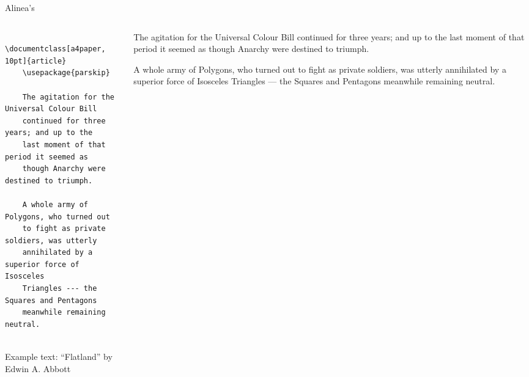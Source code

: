 \copyrightTim

\begin{frame}[fragile, t]{Alinea's}
	\begin{columns}[t]
        \begin{column}{0.5\textwidth}
	\begin{verbatim} 
	\documentclass[a4paper, 10pt]{article}
	\usepackage{parskip}
	
	The agitation for the Universal Colour Bill 
	continued for three years; and up to the 
	last moment of that period it seemed as 
	though Anarchy were destined to triumph.

	A whole army of Polygons, who turned out 
	to fight as private soldiers, was utterly 
	annihilated by a superior force of Isosceles 
	Triangles --- the Squares and Pentagons 
	meanwhile remaining neutral.
	
	\end{verbatim}
	{\tiny
	Example text: ``Flatland''
	by Edwin A. Abbott
	}\par
	\end{column}
	\begin{column}{0.5\textwidth}
	\vspace{0pt}
	\begin{tcolorbox}\small \setlength\parindent{0pt}
	The agitation for the Universal Colour Bill continued for three years; 
	and up to the last moment of that period it seemed as though Anarchy 
	were destined to triumph.
	\newline
	
	A whole army of Polygons, who turned out to fight as private soldiers, 
	was utterly annihilated by a superior force of Isosceles 
	Triangles --- the Squares and Pentagons meanwhile remaining neutral.
	\end{tcolorbox}
\end{column}
\end{columns}

\end{frame}
